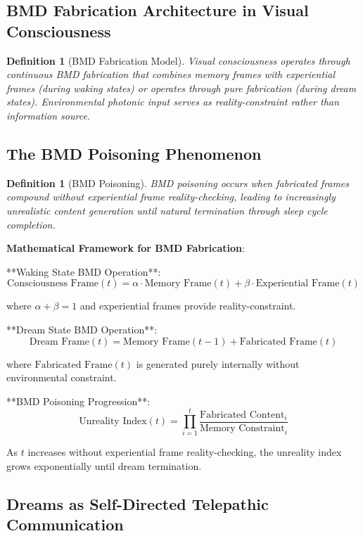 \documentclass[12pt,a4paper]{article}
\newtheorem{definition}[theorem]{Definition}
\begin{document}
\subsection{BMD Fabrication Architecture in Visual Consciousness}

\begin{definition}[BMD Fabrication Model]
Visual consciousness operates through continuous BMD fabrication that combines memory frames with experiential frames (during waking states) or operates through pure fabrication (during dream states). Environmental photonic input serves as reality-constraint rather than information source.
\end{definition}

\subsection{The BMD Poisoning Phenomenon}

\begin{definition}[BMD Poisoning]
BMD poisoning occurs when fabricated frames compound without experiential frame reality-checking, leading to increasingly unrealistic content generation until natural termination through sleep cycle completion.
\end{definition}

\textbf{Mathematical Framework for BMD Fabrication}:

**Waking State BMD Operation**:
$$\text{Consciousness Frame}(t) = \alpha \cdot \text{Memory Frame}(t) + \beta \cdot \text{Experiential Frame}(t)$$

where $\alpha + \beta = 1$ and experiential frames provide reality-constraint.

**Dream State BMD Operation**:
$$\text{Dream Frame}(t) = \text{Memory Frame}(t-1) + \text{Fabricated Frame}(t)$$

where $\text{Fabricated Frame}(t)$ is generated purely internally without environmental constraint.

**BMD Poisoning Progression**:
$$\text{Unreality Index}(t) = \prod_{i=1}^{t} \frac{\text{Fabricated Content}_i}{\text{Memory Constraint}_i}$$

As $t$ increases without experiential frame reality-checking, the unreality index grows exponentially until dream termination.

\subsection{Dreams as Self-Directed Telepathic Communication}
\end{document}
